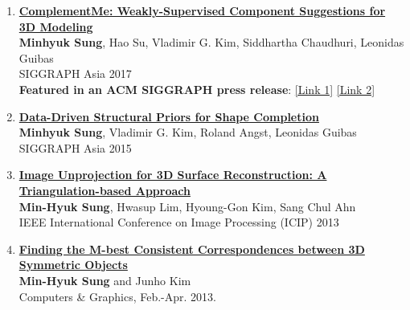 \documentclass[letterpaper,10pt]{article} %
\newcommand{\blankline}{\quad\pagebreak[2]}
\begin{document}
{\begin{enumerate}
\item \label{siggraphasia17}
\href{https://mhsung.github.io/complement-me.html}{\textbf{ComplementMe: Weakly-Supervised Component Suggestions for 3D Modeling}}\\
\textbf{Minhyuk Sung}, Hao Su, Vladimir G. Kim, Siddhartha Chaudhuri, Leonidas Guibas\\
SIGGRAPH Asia 2017\\
{\color{linkcolor}
\textbf{Featured in an ACM SIGGRAPH press release}:
\href{https://www.eurekalert.org/pub_releases/2017-11/afcm-sad120417.php}{[Link 1]}
\href{https://scienmag.com/simplifying-assembly-based-design-for-3-d-modeling/}{[Link 2]}
}\\
\blankline

\item \label{siggraphasia15}
\href{https://mhsung.github.io/structure-completion.html}{\textbf{Data-Driven Structural Priors for Shape Completion}}\\
\textbf{Minhyuk Sung}, Vladimir G. Kim, Roland Angst, Leonidas Guibas\\
SIGGRAPH Asia 2015\\
\blankline

\item \label{icip13}
\href{http://dx.doi.org/10.1109/icip.2013.6738034}{\textbf{Image Unprojection for 3D Surface Reconstruction: A Triangulation-based Approach}}\\
\textbf{Min-Hyuk Sung}, Hwasup Lim, Hyoung-Gon Kim, Sang Chul Ahn\\
IEEE International Conference on Image Processing (ICIP) 2013\\
\blankline

\item \label{cg13}
\href{http://dx.doi.org/10.1016/j.cag.2012.11.002}{\textbf{Finding the M-best Consistent Correspondences between 3D Symmetric Objects}} \\
\textbf{Min-Hyuk Sung} and Junho Kim\\
Computers \& Graphics, Feb.-Apr. 2013.\\
\blankline


\end{enumerate}}
\end{document}
